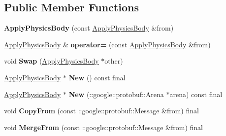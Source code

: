 \subsection*{Public Member Functions}
\begin{DoxyCompactItemize}
\item 
\mbox{\label{classtbBasics_1_1ApplyPhysicsBody_a433051e19a2465744f2eba4397206cd0}} 
{\bfseries Apply\+Physics\+Body} (const \hyperlink{classtbBasics_1_1ApplyPhysicsBody}{Apply\+Physics\+Body} \&from)
\item 
\mbox{\label{classtbBasics_1_1ApplyPhysicsBody_a4b80294da46db71cb3a9302d8627efbd}} 
\hyperlink{classtbBasics_1_1ApplyPhysicsBody}{Apply\+Physics\+Body} \& {\bfseries operator=} (const \hyperlink{classtbBasics_1_1ApplyPhysicsBody}{Apply\+Physics\+Body} \&from)
\item 
\mbox{\label{classtbBasics_1_1ApplyPhysicsBody_ada3c30bfa3c30a6723050893deb8b793}} 
void {\bfseries Swap} (\hyperlink{classtbBasics_1_1ApplyPhysicsBody}{Apply\+Physics\+Body} $\ast$other)
\item 
\mbox{\label{classtbBasics_1_1ApplyPhysicsBody_a89af82acb9d6c40bccb167c597d90547}} 
\hyperlink{classtbBasics_1_1ApplyPhysicsBody}{Apply\+Physics\+Body} $\ast$ {\bfseries New} () const final
\item 
\mbox{\label{classtbBasics_1_1ApplyPhysicsBody_ae87da4e97dcdd4c8ff79045d39b0c47e}} 
\hyperlink{classtbBasics_1_1ApplyPhysicsBody}{Apply\+Physics\+Body} $\ast$ {\bfseries New} (\+::google\+::protobuf\+::\+Arena $\ast$arena) const final
\item 
\mbox{\label{classtbBasics_1_1ApplyPhysicsBody_a352ff64aafa11ca600e6ded25c4e6ff8}} 
void {\bfseries Copy\+From} (const \+::google\+::protobuf\+::\+Message \&from) final
\item 
\mbox{\label{classtbBasics_1_1ApplyPhysicsBody_a99c0a8df25fb94d563141251c74508e9}} 
void {\bfseries Merge\+From} (const \+::google\+::protobuf\+::\+Message \&from) final
\item 

\end{DoxyCompactItemize}
